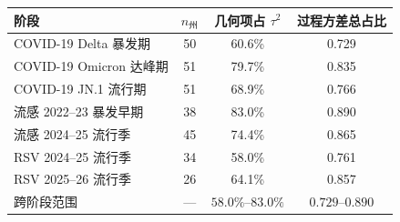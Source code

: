\begin{tabular}{lccc}
\toprule
阶段 & $n_{\text{州}}$ & 几何项占 $\tau^2$ & 过程方差总占比 \\
\midrule
COVID-19 Delta 暴发期 & 50 & 60.6\% & 0.729 \\
COVID-19 Omicron 达峰期 & 51 & 79.7\% & 0.835 \\
COVID-19 JN.1 流行期 & 51 & 68.9\% & 0.766 \\
流感 2022--23 暴发早期 & 38 & 83.0\% & 0.890 \\
流感 2024--25 流行季 & 45 & 74.4\% & 0.865 \\
RSV 2024--25 流行季 & 34 & 58.0\% & 0.761 \\
RSV 2025--26 流行季 & 26 & 64.1\% & 0.857 \\
\midrule
跨阶段范围 & --- & $58.0\%$--$83.0\%$ & $0.729$--$0.890$ \\
\bottomrule
\end{tabular}
